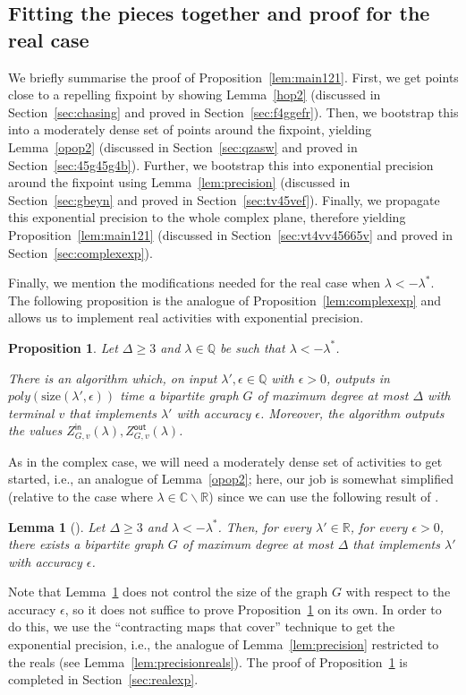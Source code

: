 \documentclass[11pt]{article}
\newtheorem{lemma}[theorem]{Lemma}
\newtheorem{proposition}[theorem]{Proposition}
\def\Zin{Z^{\mathsf{in}}}
\def\Zout{Z^{\mathsf{out}}}
\def\Reals{\mathbb{R}}
\def\QQ{\mathbb{Q}}
\def\Complex{\mathbb{C}}
\newcommand{\size}[1]{\mathrm{size}(#1)}
\newcommand{\eps}{\epsilon}
\begin{document}
\subsection{Fitting the pieces together and proof for the real case}\label{sec:realmod}

We briefly summarise the proof of  Proposition~\ref{lem:main121}. First, we get points close to a repelling fixpoint by showing Lemma~\ref{hop2} (discussed in Section~\ref{sec:chasing} and proved in Section~\ref{sec:f4ggefr}). Then, we bootstrap this into a moderately dense set of points around the fixpoint, yielding Lemma~\ref{opop2} (discussed in Section~\ref{sec:qzasw} and proved in Section~\ref{sec:45g45g4b}). Further, we bootstrap this into exponential precision around the fixpoint using Lemma~\ref{lem:precision} (discussed in Section~\ref{sec:gbeyn} and proved in Section~\ref{sec:tv45vef}). Finally, we propagate this exponential precision to the whole complex plane, therefore yielding  Proposition~\ref{lem:main121} (discussed in Section~\ref{sec:vt4vv45665v} and proved in Section~\ref{sec:complexexp}).


Finally, we mention the modifications needed for the real case when $\lambda<-\lambda^*$. The following proposition is the analogue of Proposition~\ref{lem:complexexp} and allows us to implement real activities with exponential precision.
\newcommand{\statelemrealexp}{Let $\Delta\geq 3$ and $\lambda \in \QQ$ be such that $\lambda<-\lambda^*$.  

There is an algorithm which, on input $\lambda',\eps\in \QQ$ with $\eps>0$, outputs in $poly(\size{\lambda',\eps})$ time a bipartite graph $G$ of maximum degree at most  $\Delta$ with terminal $v$ that implements $\lambda'$ with accuracy $\eps$. Moreover, the algorithm outputs the values $\Zin_{G,v}(\lambda),\Zout_{G,v}(\lambda)$.}
\begin{proposition}\label{lem:realexp}
\statelemrealexp
\end{proposition}

As in the complex case, we will need a moderately dense set of activities to get started, i.e., an analogue of Lemma~\ref{opop2}; here, our job is somewhat simplified (relative to the case where $\lambda\in \Complex\backslash \Reals$) since  we can use the  following result of \cite{GGS} .
\begin{lemma}[{\cite[Lemma 4]{GGS}}]\label{lem:realeps}
Let $\Delta\geq 3$ and $\lambda<-\lambda^*$.  Then, for every $\lambda'\in\mathbb{R}$, for every $\epsilon>0$, there exists a bipartite graph $G$ of maximum degree at most  $\Delta$ that implements $\lambda'$ with accuracy $\epsilon$. 
\end{lemma}
Note that Lemma~\ref{lem:realeps} does not control the size of the graph $G$ with respect to the accuracy $\epsilon$, so it does not suffice to prove Proposition~\ref{lem:realexp} on its own. In order to do this, we use the ``contracting maps that cover''  technique to get the exponential precision, i.e.,  the analogue of Lemma~\ref{lem:precision} restricted to the reals (see Lemma~\ref{lem:precisionreals}). The proof of Proposition~\ref{lem:realexp} is completed in Section~\ref{sec:realexp}.
\end{document}
